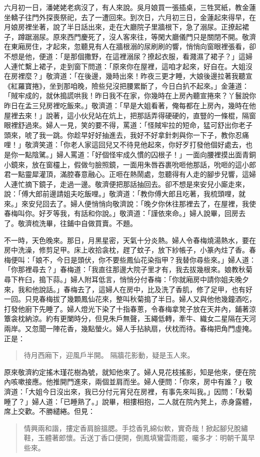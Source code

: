 六月初一日，潘姥姥老病沒了，有人來說。吳月娘買一張插桌，三牲冥紙，教金蓮坐轎子往門外探喪祭祀，去了一遭回來。到次日，六月初三日，金蓮起來得早，在月娘房裡坐著，說了半日話出來，走在大廳院子里牆根下，急了溺尿。正撩起裙子，蹲踞溺尿。原來西門慶死了，沒人客來往，等閑大廳儀門只是關閉不開。敬濟在東廂房住，才起來，忽聽見有人在牆根溺的尿刷刷的響，悄悄向窗眼裡張看，卻不想是他，便道：「是那個撒野，在這裡溺尿？撩起衣服，看濺濕了裙子？」這婦人連忙繫上裙子，走到窗下問道：「原來你在屋裡，這咱才起來，好自在。大姐沒在房裡麼？」敬濟道：「在後邊，幾時出來！昨夜三更才睡，大娘後邊拉著我聽宣《紅羅寶捲》，坐到那咱晚，險些兒沒把腰累斷了，今日白扒不起來。」金蓮道：「賊牢成的，就休搗謊哄我！昨日我不在家，你幾時在上房內聽宣捲來？丫鬟說你昨日在孟三兒房裡吃飯來。」敬濟道：「早是大姐看著，俺每都在上房內，幾時在他屋裡去來！」說著，這小伙兒站在炕上，把那話弄得硬硬的，直豎的一條棍，隔窗眼裡舒過來。婦人一見，笑的要不得，罵道：「怪賊牢拉的短命，猛可舒出你老子頭來，唬了我一跳。你趁早好好抽進去，我好不好拿針刺與你一下子，教你忍痛哩！」敬濟笑道：「你老人家這回兒又不待見他起來，你好歹打發他個好處去，也是你一點陰騭。」婦人罵道：「好個怪牢成久慣的囚根子！」一面向腰裡摸出面青銅小鏡來，放在窗欞上，假做勻臉照鏡，一面用朱唇吞裹吮咂他那話，吮咂的這小郎君一點靈犀灌頂，滿腔春意融心。正咂在熱鬧處，忽聽得有人走的腳步兒響，這婦人連忙摘下鏡子，走過一邊。敬濟便把那話抽回去。卻不想是來安兒小廝走來，說：「傅大郎前邊請姐夫吃飯哩。」敬濟道：「教你傅大郎且吃著，我梳頭哩，就來。」來安兒回去了。婦人便悄悄向敬濟說：「晚夕你休往那裡去了，在屋裡，我使春梅叫你。好歹等我，有話和你說。」敬濟道：「謹依來命。」婦人說畢，回房去了。敬濟梳洗畢，往鋪中自做買賣。不題。

不一時，天色晚來。那日，月黑星密，天氣十分炎熱。婦人令春梅燒湯熱水，要在房中洗澡，修剪足甲。床上收拾衾枕，趕了蚊子，放下紗帳子，小篆內炷了香。春梅便叫：「娘不，今日是頭伏，你不要些鳳仙花染指甲？我替你尋些來。」婦人道：「你那裡尋去？」春梅道：「我直往那邊大院子里才有，我去拔幾根來。娘教秋菊尋下杵臼，搗下蒜。」婦人附耳低言，悄悄分付春梅：「你就廂房中請你姐夫晚夕來，我和他說話。」春梅去了，這婦人在房中，比及洗了香肌，修了足甲，也有好一回。只見春梅拔了幾顆鳳仙花來，整叫秋菊搗了半日。婦人又與他他幾鐘酒吃，打發他廚下先睡了。婦人燈光下染了十指春蔥，令春梅拿凳子放在天井內，鋪著涼簟衾枕納涼。約有更闌時分，但見朱戶無聲，玉繩低轉，牽牛、織女二星隔在天河兩岸。又忽聞一陣花香，幾點螢火。婦人手拈紈扇，伏枕而待。春梅把角門虛掩。正是：
\begin{quote}
待月西廂下，迎風戶半開。
隔牆花影動，疑是玉人來。
\end{quote}

原來敬濟約定搖木瑾花樹為號，就知他來了。婦人見花枝搖影，知是他來，便在院內咳嗽接應。他推開門進來，兩個並肩而坐。婦人便問：「你來，房中有誰？」敬濟道：「大姐今日沒出來，我已分付元宵兒在房裡，有事先來叫我。」因問：「秋菊睡了？」婦人道：「已睡熟了。」說畢，相摟相抱，二人就在院內凳上，赤身露體，席上交歡。不勝繾綣。但見：
\begin{quote}
情興兩和諧，摟定香肩臉搵腮。手捻香乳綿似軟，實奇哉！掀起腳兒脫繡鞋，玉體著郎懷。舌送丁香口便開，倒鳳填鸞雲雨罷，囑多才：明朝千萬早些來。
\end{quote}

